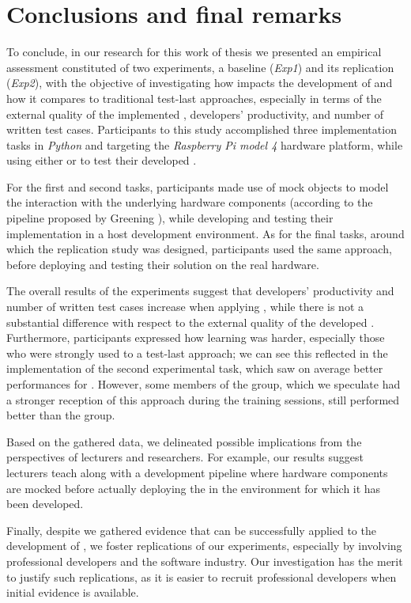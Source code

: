 \chapter{Conclusions and final remarks}
\label{chap:7_conclusions}
To conclude, in our research for this work of thesis we presented an empirical assessment constituted of two experiments, a baseline (\textit{Exp1}) and its replication (\textit{Exp2}), with the objective of investigating how \tdd impacts the development of \ess and how it compares to traditional test-last approaches, especially in terms of the external quality of the implemented \es, developers' productivity, and number of written test cases. 
Participants to this study accomplished three implementation tasks in \textit{Python} and targeting the \textit{Raspberry Pi model 4} hardware platform, while using either \tdd or \notdd to test their developed \ess.

For the first and second tasks, participants made use of mock objects to model the interaction with the underlying hardware components (according to the pipeline proposed by Greening \cite{TDDEC}), while developing and testing their implementation in a host development environment. As for the final tasks, around which the replication study was designed, participants used the same approach, before deploying and testing their solution on the real hardware.

The overall results of the experiments suggest that developers' productivity and number of written test cases increase when applying \tdd, while there is not a substantial difference with respect to the external quality of the developed \ess. Furthermore, participants expressed how learning \tdd was harder, especially those who were strongly used to a test-last approach; we can see this reflected in the implementation of the second experimental task, which saw on average better performances for \notdd. However, some members of the \tdd group, which we speculate had a stronger reception of this approach during the training sessions, still performed better than the \notdd group.

Based on the gathered data, we delineated possible implications from the perspectives of lecturers and researchers. For example, our results suggest lecturers teach \tdd along with a development pipeline where hardware components are mocked before actually deploying the \es in the environment for which it has been developed. 

Finally, despite we gathered evidence that \tdd can be successfully applied to the development of \ess, we foster replications of our experiments, especially by involving professional developers and the software industry. 
Our investigation has the merit to justify such replications, as it is easier to recruit professional developers when initial evidence is available. 

